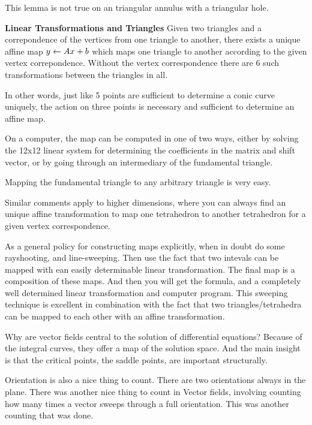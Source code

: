 This lemma is not true on an triangular annulus with a triangular hole. 

\begin{ftheo}
  \textbf{Linear Transformations and Triangles} Given two triangles and
  a correpondence of the vertices from one triangle to another, there exists
  a unique affine map $y \leftarrow Ax+b$ which maps one triangle to another according
  to the given vertex correpondence. Without the vertex correspondence there
  are 6 such transformations between the triangles in all.

  In other words, just like 5 points are sufficient to determine a conic
  curve uniquely, the action on three points is necessary and sufficient
  to determine an affine map.

  On a computer, the map can be computed in one of two ways, either by
  solving the 12x12 linear system for determining the coefficients in the
  matrix and shift vector, or by going through an intermediary of the
  fundamental triangle.

  Mapping the fundamental triangle to any arbitrary triangle is very easy. 

  Similar comments apply to higher dimensions, where you can always find
  an unique affine transformation to map one tetrahedron to another tetrahedron
  for a given vertex correspondence. 
\end{ftheo}


\newchunk As a general policy for constructing maps explicitly, when in doubt do
some rayshooting, and line-sweeping. Then use the fact that two intevals can be
mapped with ean easily determinable linear transformation. The final map is a
composition of these maps. And then you will get the formula, and a completely
well determined linear transformation and computer program. This sweeping technique is
excellent in combination with the fact that two triangles/tetrahedra can be mapped
to each other with an affine transformation. 


\newchunk Why are vector fields central to the solution of differential equations?
Because of the integral curves, they offer a map of the solution space. And the main
insight is that the critical points, the saddle points, are important structurally. 


\newchunk Orientation is also a nice thing to count. There are two orientations
always in the plane. There was another nice thing to count in Vector fields,
involving counting how many times a vector sweeps through a full orientation.
This was another counting that was done. 

